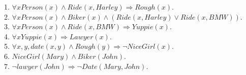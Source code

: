 \documentclass[a4paper]{article}
\begin{document}
\begin{enumerate}[1.]
1. $\forall x Person(x) \wedge Ride(x, Harley) \Rightarrow Rough(x)$.\\
2. $\forall x Person(x) \wedge Biker(x) \wedge (Ride(x, Harley) \vee Ride(x, BMW))$.\\
3. $\forall x Person(x) \wedge Ride(x, BMW) \Rightarrow Yuppie(x)$.\\
4. $\forall x Yuppie(x) \Rightarrow Lawyer(x)$.\\
5. $\forall x,y, date(x, y) \wedge Rough(y) \Rightarrow \neg NiceGirl(x)$.\\
6. $NiceGirl(Mary) \wedge Biker(John)$.\\
7. $\neg lawyer(John) \Rightarrow \neg Date(Mary, John)$.\\

\end{enumerate}
\end{document}

